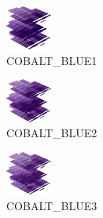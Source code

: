 \hspace{0.1cm}
\begin{minipage}[b]{0.15\linewidth}
\begin{figure}[H]                                                          
  \centering                                                             
  \begin{adjustbox}{width=1.5cm,center}                                   
  \includegraphics[width=1.5cm]{src/colorspace_colourflow/flows/colourflow_97-45.png}%
  \end{adjustbox}                                                        
\caption*{COBALT\_BLUE1}                                           
\end{figure}                                                               
\end{minipage}
\hspace{0.1cm}
\begin{minipage}[b]{0.15\linewidth}
\begin{figure}[H]                                                          
  \centering                                                             
  \begin{adjustbox}{width=1.5cm,center}                                   
  \includegraphics[width=1.5cm]{src/colorspace_colourflow/flows/colourflow_98-45.png}%
  \end{adjustbox}                                                        
\caption*{COBALT\_BLUE2}                                           
\end{figure}                                                               
\end{minipage}
\hspace{0.1cm}
\begin{minipage}[b]{0.15\linewidth}
\begin{figure}[H]                                                          
  \centering                                                             
  \begin{adjustbox}{width=1.5cm,center}                                   
  \includegraphics[width=1.5cm]{src/colorspace_colourflow/flows/colourflow_99-45.png}%
  \end{adjustbox}                                                        
\caption*{COBALT\_BLUE3}                                           
\end{figure}                                                               
\end{minipage}
